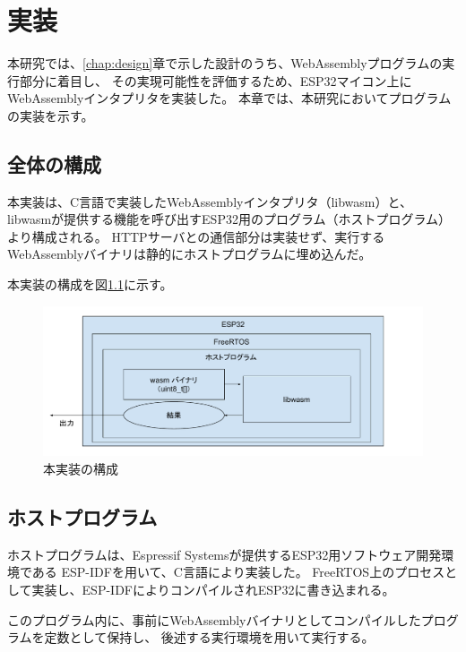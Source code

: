 \chapter{実装}
\label{chap:implementation}

本研究では、\ref{chap:design}章で示した設計のうち、WebAssemblyプログラムの実行部分に着目し、
その実現可能性を評価するため、ESP32マイコン上にWebAssemblyインタプリタを実装した。
本章では、本研究においてプログラムの実装を示す。

\section{全体の構成}

本実装は、C言語で実装したWebAssemblyインタプリタ（libwasm）と、
libwasmが提供する機能を呼び出すESP32用のプログラム（ホストプログラム）より構成される。
HTTPサーバとの通信部分は実装せず、実行するWebAssemblyバイナリは静的にホストプログラムに埋め込んだ。

本実装の構成を図\ref{fig:esp32_libwasm}に示す。

\begin{figure}[htbp]
  \caption{本実装の構成}
  \label{fig:esp32_libwasm}
  \begin{center}
    \includegraphics[bb=0 0 800 300,width=12cm]{img/esp32_libwasm.pdf}
  \end{center}
\end{figure}

\section{ホストプログラム}

ホストプログラムは、Espressif Systemsが提供するESP32用ソフトウェア開発環境である
ESP-IDF\cite{esp_idf}を用いて、C言語により実装した。
FreeRTOS上のプロセスとして実装し、ESP-IDFによりコンパイルされESP32に書き込まれる。

このプログラム内に、事前にWebAssemblyバイナリとしてコンパイルしたプログラムを定数として保持し、
後述する実行環境を用いて実行する。

